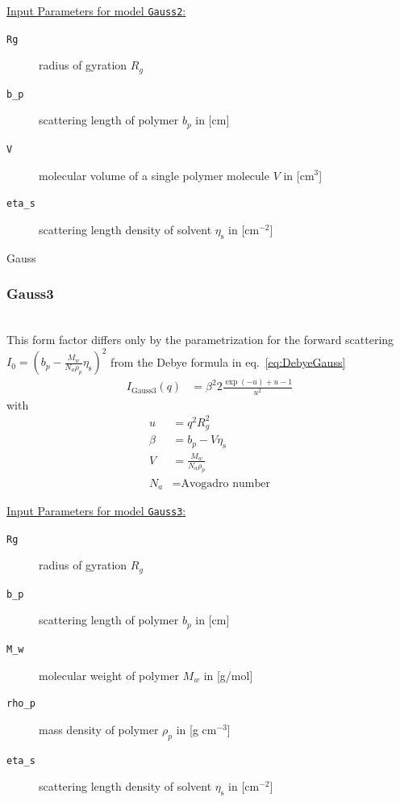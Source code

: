 \vspace{5mm}
\underline{Input Parameters for model \texttt{Gauss2}:}
\begin{description}
\item[\texttt{Rg}] radius of gyration $R_g$
\item[\texttt{b\_p}] scattering length of polymer $b_p$ in [cm]
\item[\texttt{V}] molecular volume of a single polymer molecule $V$ in [cm$^3$]
\item[\texttt{eta\_s}] scattering length density of solvent $\eta_\text{s}$ in [cm$^{-2}$]
\end{description}

\textcolor[rgb]{1.00,1.00,1.00}{Gauss}\\
\subsubsection{Gauss3}
\label{sect:Gauss3}
~\\
This form factor  \cite{Debye1947} differs only by the parametrization for the forward scattering
$I_0=(b_p-\frac{M_w}{N_a\rho_p}\eta_\text{s})^2$ from the Debye formula in eq.\ \ref{eq:DebyeGauss}
\begin{align}
I_\text{Gauss3}(q) &= \beta^2 2\frac{\exp(-u)+u-1}{u^2}
\end{align}
with
\begin{align}
u &= q^2R_g^2 \nonumber \\
\beta &= b_p-V\eta_\text{s} \nonumber\\
V &= \frac{M_w}{N_a\rho_p} \nonumber \\
N_a &= \mbox{Avogadro number} \nonumber
\end{align}

\underline{Input Parameters for model \texttt{Gauss3}:}
\begin{description}
\item[\texttt{Rg}] radius of gyration $R_g$
\item[\texttt{b\_p}] scattering length of polymer $b_p$ in [cm]
\item[\texttt{M\_w}] molecular weight of polymer $M_w$ in [g/mol]
\item[\texttt{rho\_p}] mass density of polymer $\rho_p$ in [g cm$^{-3}$]
\item[\texttt{eta\_s}] scattering length density of solvent $\eta_\text{s}$ in [cm$^{-2}$]
\end{description}

